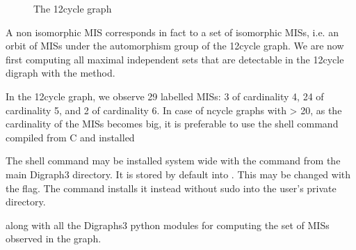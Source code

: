 \documentclass[a4paper,10pt,english]{sphinxhowto}
\let\sphinxpxdimen\pdfpxdimen\else\newdimen\sphinxpxdimen
\begin{document}
\begin{figure}[htbp]
\centering
\capstart

\noindent\sphinxincludegraphics[width=400\sphinxpxdimen]{{cg12}.png}
\caption{The 12\sphinxhyphen{}cycle graph}\label{\detokenize{tutorial:id132}}\end{figure}

A non isomorphic MIS corresponds in fact to a set of isomorphic MISs, i.e. an orbit of MISs under the automorphism group of the 12\sphinxhyphen{}cycle graph. We are now first computing all maximal independent sets that are detectable in the 12\sphinxhyphen{}cycle digraph with the  method.

\begin{sphinxVerbatim}[commandchars=\\\{\},numbers=left,firstnumber=1,stepnumber=1]
\end{sphinxVerbatim}

In the 12\sphinxhyphen{}cycle graph, we observe 29 labelled MISs: \textendash{} 3 of cardinality 4, 24 of cardinality 5, and 2  of cardinality 6. In case of n\sphinxhyphen{}cycle graphs with  \textgreater{} 20, as the cardinality of the MISs becomes big, it is preferable to use the shell  command compiled from C and installed %
\begin{footnote}[3]\sphinxAtStartFootnote
The  shell command may be installed system wide with the command  from the main Digraph3 directory. It is stored by default into . This may be changed with the  flag. The command  installs it instead without sudo into the user’s private  directory.
%
\end{footnote}  along with all the Digraphs3 python modules for computing the set of MISs observed in the graph.
\end{document}
